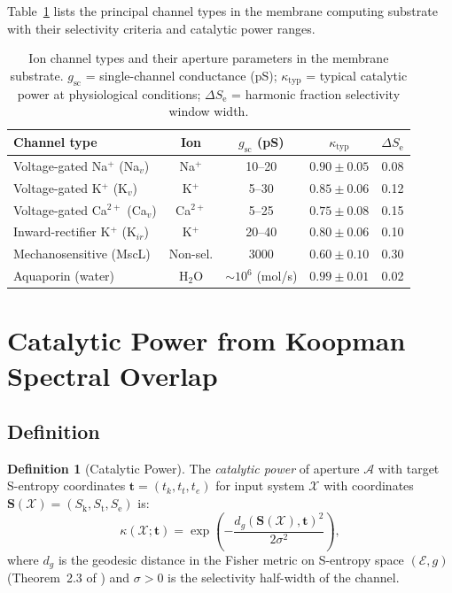 \documentclass[11pt,twocolumn,a4paper]{article}
\theoremstyle{definition}
\newtheorem{definition}[theorem]{Definition}
\theoremstyle{remark}
\newcommand{\Sk}{S_{\mathrm{k}}}
\newcommand{\St}{S_{\mathrm{t}}}
\newcommand{\Se}{S_{\mathrm{e}}}
\newcommand{\kap}{\kappa}
\newcommand{\Sent}{\bm{S}}
\begin{document}
Table~\ref{tab:channels} lists the principal channel types in the membrane
computing substrate with their selectivity criteria and catalytic power ranges.

\begin{table}[h]
\centering
\small
\caption{Ion channel types and their aperture parameters in the membrane substrate.
$g_{\mathrm{sc}}$ = single-channel conductance (pS); $\kap_{\mathrm{typ}}$ =
typical catalytic power at physiological conditions; $\Delta\Se$ = harmonic
fraction selectivity window width.}
\label{tab:channels}
\setlength{\tabcolsep}{3pt}
\begin{tabular}{lcccc}
\toprule
Channel type & Ion & $g_{\mathrm{sc}}$ (pS) & $\kap_{\mathrm{typ}}$ & $\Delta\Se$ \\
\midrule
Voltage-gated Na$^+$ (Na$_v$) & Na$^+$    & 10--20    & $0.90\pm0.05$ & 0.08 \\
Voltage-gated K$^+$ (K$_v$)   & K$^+$     & 5--30     & $0.85\pm0.06$ & 0.12 \\
Voltage-gated Ca$^{2+}$ (Ca$_v$) & Ca$^{2+}$ & 5--25  & $0.75\pm0.08$ & 0.15 \\
Inward-rectifier K$^+$ (K$_{ir}$) & K$^+$ & 20--40    & $0.80\pm0.06$ & 0.10 \\
Mechanosensitive (MscL)       & Non-sel.  & 3000      & $0.60\pm0.10$ & 0.30 \\
Aquaporin (water)             & H$_2$O    & $\sim 10^6$ (mol/s) & $0.99\pm0.01$ & 0.02 \\
\bottomrule
\end{tabular}
\end{table}

\section{Catalytic Power from Koopman Spectral Overlap}
\label{sec:catpower}

\subsection{Definition}

\begin{definition}[Catalytic Power]
\label{def:catpower}
The \emph{catalytic power} of aperture $\mathcal{A}$ with target S-entropy
coordinates $\mathbf{t} = (t_k, t_t, t_e)$ for input system $\mathcal{X}$
with coordinates $\Sent(\mathcal{X}) = (\Sk, \St, \Se)$ is:
\begin{equation}
\kap(\mathcal{X}; \mathbf{t}) = \exp\!\left(-\frac{d_g(\Sent(\mathcal{X}),\mathbf{t})^2}{2\sigma^2}\right),
\label{eq:catpower}
\end{equation}
where $d_g$ is the geodesic distance in the Fisher metric on S-entropy space
$(\mathcal{E}, g)$ (Theorem~2.3 of \citep{companion2}) and $\sigma > 0$ is the
selectivity half-width of the channel.
\end{definition}
\end{document}
